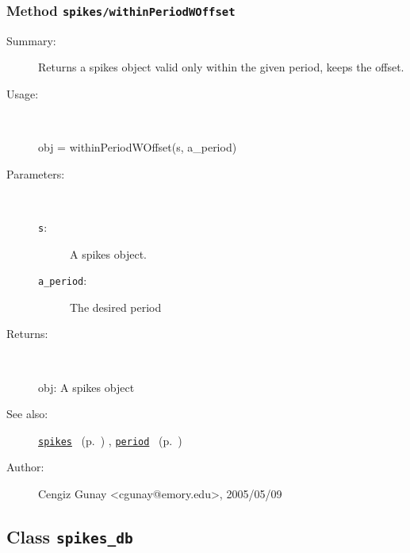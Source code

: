 \subsubsection[Method \texttt{withinPeriodWOffset}]{Method \texttt{spikes/withinPeriodWOffset}}%
%
\label{ref_spikes__withinPeriodWOffset}%
\hypertarget{ref_spikes__withinPeriodWOffset}{}%
\begin{description}
\item[Summary:]Returns a spikes object valid only within the given period, keeps the offset.
%
\item[Usage:]~%
\begin{lyxcode}%
obj = withinPeriodWOffset(s, a\_period)
%
\end{lyxcode}%
%
%
\item[Parameters:]~
\begin{description}%
\item[\texttt{s}:]
 A spikes object.
\item[\texttt{a\_period}:]
 The desired period 
\end{description}%
%
\item[Returns:
]~

	obj: A spikes object
%
%
\item[See also:]%
\hyperlink{ref_spikes}{\texttt{spikes}}%
\ (p.~\pageref{ref_spikes})%
%
, \hyperlink{ref_period}{\texttt{period}}%
\ (p.~\pageref{ref_period})%
%
%
\item[Author:]%
Cengiz Gunay <cgunay@emory.edu>, 2005/05/09
%
\end{description}
\methodline%
\subsection{Class \texttt{spikes\_db}}%
%
\label{ref_spikes_db}%
\hypertarget{ref_spikes_db}{}%
